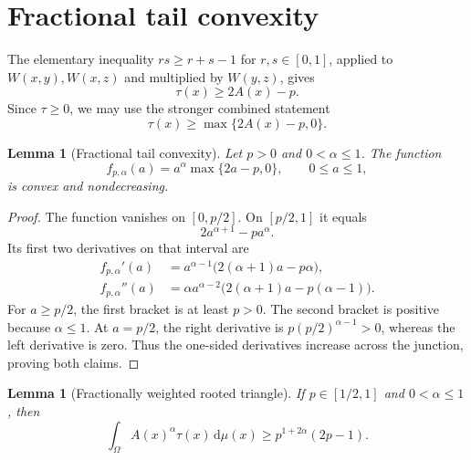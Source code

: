 \documentclass[11pt]{article}
\newtheorem{lemma}[theorem]{Lemma}
\newcommand{\dd}{\,\mathrm d}
\begin{document}
\section{Fractional tail convexity}

The elementary inequality $rs\geq r+s-1$ for $r,s\in[0,1]$, applied to
$W(x,y),W(x,z)$ and multiplied by $W(y,z)$, gives
\begin{equation}
 \tau(x)\geq2A(x)-p.
 \label{eq:pointwise}
\end{equation}
Since $\tau\geq0$, we may use the stronger combined statement
\begin{equation}
 \tau(x)\geq\max\{2A(x)-p,0\}.
 \label{eq:positive-part}
\end{equation}

\begin{lemma}[Fractional tail convexity]
\label{lem:convexity}
Let $p>0$ and $0<\alpha\leq1$.  The function
\[
 f_{p,\alpha}(a)
 =a^\alpha\max\{2a-p,0\},
 \qquad 0\leq a\leq1,
\]
is convex and nondecreasing.
\end{lemma}

\begin{proof}
The function vanishes on $[0,p/2]$.  On $[p/2,1]$ it equals
\[
 2a^{\alpha+1}-pa^\alpha.
\]
Its first two derivatives on that interval are
\begin{align*}
 f_{p,\alpha}'(a)
 &=a^{\alpha-1}\bigl(2(\alpha+1)a-p\alpha\bigr),\\
 f_{p,\alpha}''(a)
 &=\alpha a^{\alpha-2}
 \bigl(2(\alpha+1)a-p(\alpha-1)\bigr).
\end{align*}
For $a\geq p/2$, the first bracket is at least $p>0$.  The second bracket
is positive because $\alpha\leq1$.  At $a=p/2$, the right derivative is
$p(p/2)^{\alpha-1}>0$, whereas the left derivative is zero.  Thus the
one-sided derivatives increase across the junction, proving both claims.
\end{proof}

\begin{lemma}[Fractionally weighted rooted triangle]
\label{lem:weighted-triangle}
If $p\in[1/2,1]$ and $0<\alpha\leq1$, then
\begin{equation}
 \int_\Omega A(x)^\alpha\tau(x)\dd\mu(x)
 \geq p^{1+2\alpha}(2p-1).
 \label{eq:weighted-triangle}
\end{equation}
\end{lemma}
\end{document}

